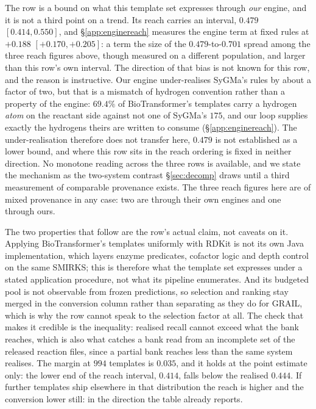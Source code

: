 The row is a bound on what this template set expresses through \emph{our} engine, and it is not a
third point on a trend. Its reach carries an interval, $0.479$ $[0.414,0.550]$, and
\S\ref{app:enginereach} measures the engine term at fixed rules at $+0.188$ $[+0.170,+0.205]$: a
term the size of the $0.479$-to-$0.701$ spread among the three reach figures above, though measured
on a different population, and larger than this row's own interval. The direction of that bias is
not known for this row, and the reason is instructive. Our engine under-realises SyGMa's rules by
about a factor of two, but that is a mismatch of hydrogen convention rather than a property of the
engine: $69.4\%$ of BioTransformer's templates carry a hydrogen \emph{atom} on the reactant side
against not one of SyGMa's $175$, and our loop supplies exactly the hydrogens theirs are written to
consume (\S\ref{app:enginereach}). The under-realisation therefore does not transfer here, $0.479$
is not established as a lower bound, and where this row sits in the reach ordering is fixed in
neither direction. No monotone reading across the three rows is available, and we
state the mechanism as the two-system contrast \S\ref{sec:decomp} draws until a third measurement of
comparable provenance exists. The three reach figures here are of mixed provenance in any case: two
are through their own engines and one through ours.

The two properties that follow are the row's actual claim, not caveats on it. Applying
BioTransformer's templates uniformly with RDKit is not its own Java implementation, which layers
enzyme predicates, cofactor logic and depth control on the same SMIRKS; this is therefore what the
template set expresses under a stated application procedure, not what its pipeline enumerates. And
its budgeted pool is not observable from frozen predictions, so selection and ranking stay merged in
the conversion column rather than separating as they do for GRAIL, which is why the row cannot
speak to the selection factor at all. The check that makes it credible is the inequality: realised
recall cannot exceed what the bank reaches, which is also what catches a bank read from an
incomplete set of the released reaction files, since a partial bank reaches less than the same
system realises. The margin at $994$ templates is $0.035$, and it holds at the point estimate only: the lower
end of the reach interval, $0.414$, falls below the realised $0.444$. If further templates ship
elsewhere in that distribution the reach is higher and the conversion lower still: in the
direction the table already reports.

